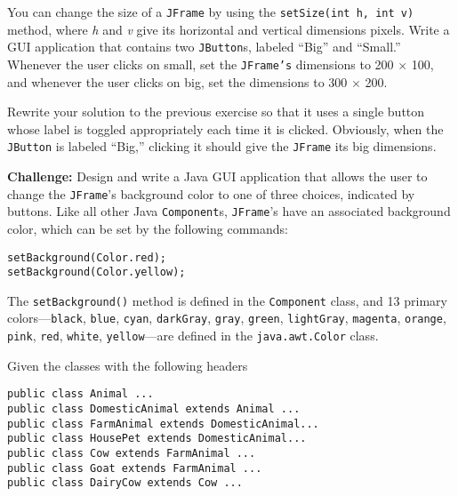 \begin{EXRtwo}
\item  You can change the size of a {\tt JFrame} by using the
{\tt setSize(int h, int v)} method, where {\it h} and {\it v} give its horizontal and vertical
dimensions pixels.  Write a GUI application that 
contains two {\tt JButton}s, labeled ``Big'' and ``Small.'' Whenever
the user clicks on small, set the {\tt JFrame's} dimensions to
200 $\times$ 100, and whenever the user clicks on big, set the dimensions
to 300 $\times$ 200.

\item  Rewrite your solution to the previous exercise
so that it uses a single button whose label is toggled appropriately
each time it is clicked.  Obviously, when the {\tt JButton} is
labeled ``Big,'' clicking it should give the {\tt JFrame} its big
dimensions.


\item  {\bf Challenge:} Design and write a Java GUI application that allows 
the user to change the {\tt JFrame}'s background color to one of three choices,
indicated by buttons.  Like all other Java {\tt Component}s, {\tt JFrame}'s
have an associated background color, which can be set by the following
commands:

\begin{jjjlisting}
\begin{lstlisting}
setBackground(Color.red);
setBackground(Color.yellow);
\end{lstlisting}
\end{jjjlisting}

\noindent The {\tt setBackground()} method is defined in the
{\tt Component} class, and 13 primary colors---{\tt black}, {\tt blue},
{\tt cyan}, {\tt darkGray}, {\tt gray}, {\tt green}, {\tt lightGray}, 
\mbox{\tt magenta}, {\tt orange}, {\tt pink}, {\tt red}, {\tt white}, {\tt yellow}---are 
defined in the {\tt java.awt.Color} class.

\label{additional-exercises}

\item Given the classes with the following headers
\begin{jjjlisting}
\begin{lstlisting}
public class Animal ...
public class DomesticAnimal extends Animal ...
public class FarmAnimal extends DomesticAnimal...
public class HousePet extends DomesticAnimal...
public class Cow extends FarmAnimal ...
public class Goat extends FarmAnimal ...
public class DairyCow extends Cow ...
\end{lstlisting}
\end{jjjlisting}


\end{EXRtwo}
